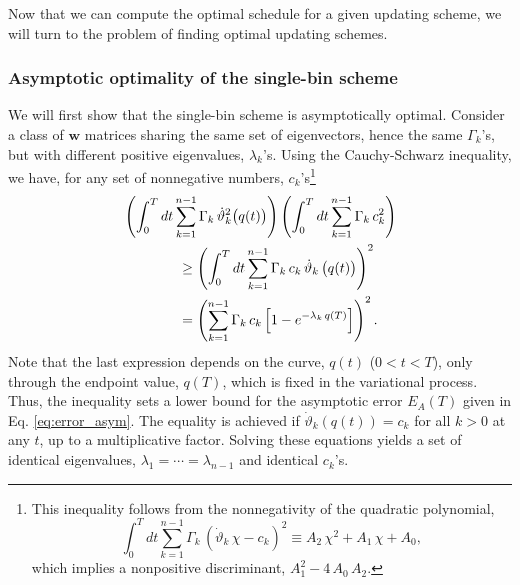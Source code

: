\documentclass[preprint, superscriptaddress, floatfix]{revtex4-1}
\newcommand{\Err}{E}
\begin{document}
Now that we can compute the optimal schedule
for a given updating scheme,
we will turn to the problem of finding
optimal updating schemes.


\subsubsection{\label{sec:optWL}
Asymptotic optimality of the single-bin scheme}



We will first show
that the single-bin scheme is asymptotically optimal.
%
Consider a class of $\mathbf w$ matrices
sharing the same set of eigenvectors,
hence the same $\Gamma_k$'s,
but with different positive eigenvalues,
$\lambda_k$'s.
%
Using the Cauchy-Schwarz inequality, we have,
for any set of nonnegative numbers, $c_k$'s\footnote{This
inequality follows from the nonnegativity of
the quadratic polynomial,
$$
\int_0^T
  dt \sum_{k = 1}^{n-1} \Gamma_k \,
    \left( {\dot \vartheta}_k \, \chi - c_k \right)^2
  \equiv
  A_2 \, \chi^2 + A_1 \, \chi + A_0
  ,
$$
which implies a nonpositive discriminant,
$A_1^2 - 4 \, A_0 \, A_2$.}
%
%
\begin{align}
&
\left(
  \int_0^T dt
    \sum_{k = 1}^{n-1}
      \Gamma_k \, {\dot \vartheta}_k^2\bigl( q(t) \bigr)
\right)
%
\left(
  \int_0^T dt
    \sum_{k = 1}^{n-1}
      \Gamma_k \, c_k^2
\right)
%
\notag
\\
&
\qquad \qquad
\ge
\left(
  \int_0^T dt
    \sum_{k = 1}^{n-1}
      \Gamma_k \, c_k \, {\dot \vartheta}_k \, \bigl( q(t) \bigr)
\right)^2
\notag
\\
&
\qquad \qquad
=
\left(
  \sum_{k = 1}^{n-1} \Gamma_k \, c_k
    \left[
      1 - e^{ -\lambda_k \, q(T) }
    \right]
\right)^2.
\notag
\end{align}
%
Note that the last expression %
depends on the curve, $q(t)$ ($0 < t < T$),
only through the endpoint value, $q(T)$,
which is fixed in the variational process.
%
Thus, the inequality sets a lower bound
for the asymptotic error $\Err_A(T)$
given in Eq. \eqref{eq:error_asym}.
%
The equality is achieved
if $\dot \vartheta_k\left( q(t) \right) = c_k$
for all $k > 0$ at any $t$,
up to a multiplicative factor.
%
Solving these equations yields
a set of identical eigenvalues,
$\lambda_1 = \cdots = \lambda_{n-1}$
and identical $c_k$'s.
\end{document}
